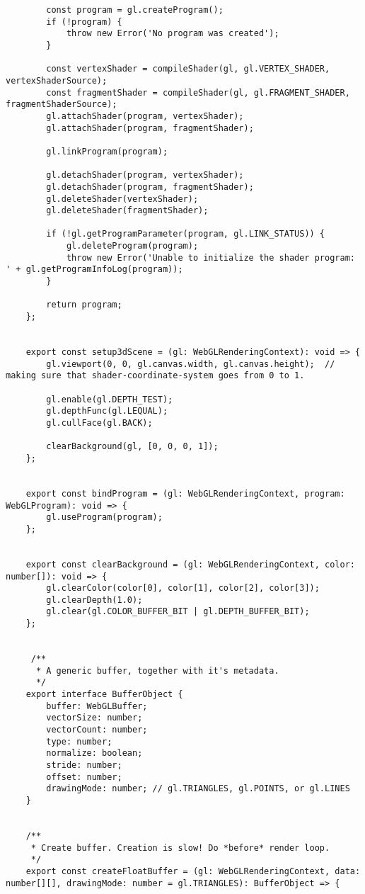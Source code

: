 {\begin{lstlisting}
        const program = gl.createProgram();
        if (!program) {
            throw new Error('No program was created');
        }
    
        const vertexShader = compileShader(gl, gl.VERTEX_SHADER, vertexShaderSource);
        const fragmentShader = compileShader(gl, gl.FRAGMENT_SHADER, fragmentShaderSource);
        gl.attachShader(program, vertexShader);
        gl.attachShader(program, fragmentShader);
    
        gl.linkProgram(program);
    
        gl.detachShader(program, vertexShader);
        gl.detachShader(program, fragmentShader);
        gl.deleteShader(vertexShader);
        gl.deleteShader(fragmentShader);
    
        if (!gl.getProgramParameter(program, gl.LINK_STATUS)) {
            gl.deleteProgram(program);
            throw new Error('Unable to initialize the shader program: ' + gl.getProgramInfoLog(program));
        }
    
        return program;
    };
    
    
    export const setup3dScene = (gl: WebGLRenderingContext): void => {
        gl.viewport(0, 0, gl.canvas.width, gl.canvas.height);  // making sure that shader-coordinate-system goes from 0 to 1.
    
        gl.enable(gl.DEPTH_TEST);
        gl.depthFunc(gl.LEQUAL);
        gl.cullFace(gl.BACK);
    
        clearBackground(gl, [0, 0, 0, 1]);
    };
    
    
    export const bindProgram = (gl: WebGLRenderingContext, program: WebGLProgram): void => {
        gl.useProgram(program);
    };
    
    
    export const clearBackground = (gl: WebGLRenderingContext, color: number[]): void => {
        gl.clearColor(color[0], color[1], color[2], color[3]);
        gl.clearDepth(1.0);
        gl.clear(gl.COLOR_BUFFER_BIT | gl.DEPTH_BUFFER_BIT);
    };
    
    
     /**
      * A generic buffer, together with it's metadata.
      */
    export interface BufferObject {
        buffer: WebGLBuffer;
        vectorSize: number;
        vectorCount: number;
        type: number;
        normalize: boolean;
        stride: number;
        offset: number;
        drawingMode: number; // gl.TRIANGLES, gl.POINTS, or gl.LINES
    }
    
    
    /**
     * Create buffer. Creation is slow! Do *before* render loop.
     */
    export const createFloatBuffer = (gl: WebGLRenderingContext, data: number[][], drawingMode: number = gl.TRIANGLES): BufferObject => {
    

\end{lstlisting}}
